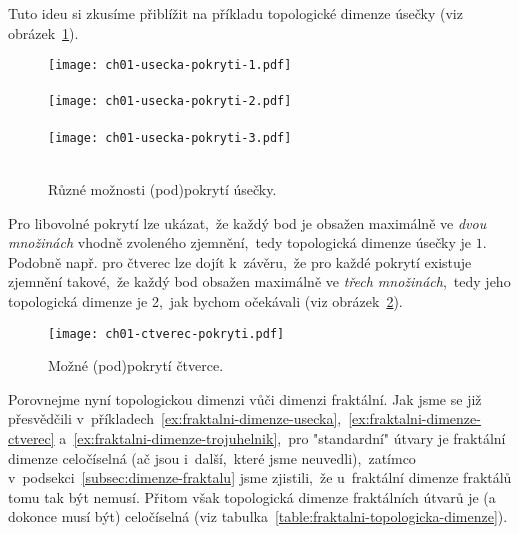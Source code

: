
Tuto ideu si zkusíme přiblížit na příkladu topologické dimenze úsečky (viz obrázek~\ref{fig:usecka-zjemneni}).
\begin{figure}[h]
    \centering
    \texttt{[image: ch01-usecka-pokryti-1.pdf]}\\\qquad\\
    \texttt{[image: ch01-usecka-pokryti-2.pdf]}\\\qquad\\
    \texttt{[image: ch01-usecka-pokryti-3.pdf]}\\\qquad\\
    \caption{Různé možnosti (pod)pokrytí úsečky.}
    \label{fig:usecka-zjemneni}
\end{figure}
Pro libovolné pokrytí lze ukázat,~že každý bod je obsažen maximálně ve \emph{dvou množinách} vhodně zvoleného zjemnění,~tedy topologická dimenze úsečky je $1$. Podobně např. pro čtverec lze dojít k~závěru,~že pro každé pokrytí existuje zjemnění takové,~že každý bod obsažen maximálně ve \emph{třech množinách},~tedy jeho topologická dimenze je 2,~jak bychom očekávali (viz obrázek~\ref{fig:ctverec-zjemneni}).
\begin{figure}[h]
    \centering
    \texttt{[image: ch01-ctverec-pokryti.pdf]}
    \caption{Možné (pod)pokrytí čtverce.}
    \label{fig:ctverec-zjemneni}
\end{figure}
Porovnejme nyní topologickou dimenzi vůči dimenzi fraktální. Jak jsme se již přesvědčili v~příkladech~\ref{ex:fraktalni-dimenze-usecka},~\ref{ex:fraktalni-dimenze-ctverec} a~\ref{ex:fraktalni-dimenze-trojuhelnik},~pro "standardní" útvary je fraktální dimenze celočíselná (ač jsou i~další,~které jsme neuvedli),~zatímco v~podsekci~\ref{subsec:dimenze-fraktalu} jsme zjistili,~že u~fraktální dimenze fraktálů tomu tak být nemusí. Přitom však topologická dimenze fraktálních útvarů je (a dokonce musí být) celočíselná (viz tabulka~\ref{table:fraktalni-topologicka-dimenze}).
